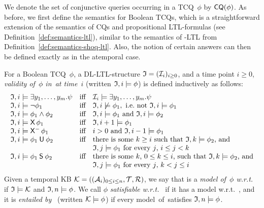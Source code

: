 \noindent
We denote the set of conjunctive queries occurring in a TCQ~$\phi$ by
$\operatorname{\mathsf{CQ}}(\phi)$.  As before, we first define the semantics for Boolean TCQs, which
is a straightforward extension of the semantics of CQs and propositional
LTL-formulas (see Definition~\ref{def:semantics-ltl}), similar to the semantics
of \SHOQ-LTL from Definition~\ref{def:semantics-shoq-ltl}.
%
Also, the notion of certain answers can then be defined exactly as in the
atemporal case.

\begin{definition}\label{def:semantics-tcqs}
    For a Boolean TCQ~$\phi$, a DL-LTL-structure $\mathfrak{I}=(\mathcal{I}_i)_{i\ge 0}$, and
    a time point $i\ge 0$, \emph{validity of~$\phi$ in~\Imf at time~$i$}
    (written $\mathfrak{I},i\models\phi$) is defined inductively as follows:
    \[\begin{array}{lcl}
        \Imf,i\models\exists y_1,\dots,y_m.\psi
            &\text{iff}
            &\Imc_i\models\exists y_1,\dots,y_m.\psi\\
        \Imf,i\models\lnot\phi_1
            &\text{iff}
            &\Imf,i\not\models\phi_1,\ \text{i.e.~not}\ \Imf,i\models\phi_1\\
        \Imf,i\models\phi_1\land\phi_2
            &\text{iff}
            &\Imf,i\models\phi_1\ \text{and}\ \Imf,i\models\phi_2\\
        \Imf,i\models\Next\phi_1
            &\text{iff}
            &\Imf,i+1\models\phi_1\\
        \Imf,i\models\Previous\phi_1
            &\text{iff}
            &i>0\ \text{and}\ \Imf,i-1\models\phi_1\\
        \Imf,i\models\phi_1\Until\phi_2
            &\text{iff}
            &\text{there is some $k\geq i$ such that $\Imf,k\models\phi_2$, and}\\
            & &\text{$\Imf,j\models\phi_1$ for every $j$, $i\le j<k$}\\
        \Imf,i\models\phi_1\Since\phi_2
            &\text{iff}
            &\text{there is some $k$, $0\le k\le i$, such that $\Imf,k\models\phi_2$, and}\\
            & &\text{$\Imf,j\models\phi_1$ for every $j$, $k<j\le i$}
    \end{array}\]
    Given a temporal KB $\mathcal{K}=((\mathcal{A}_i)_{0\le i\le n},\mathcal{T},\mathcal{R})$,
    we say that \Imf is a \emph{model of~$\phi$ w.r.t.~\Kmc} if
    $\mathfrak{I}\models\mathcal{K}$ and $\mathfrak{I},n\models\phi$.  We call $\phi$ \emph{satisfiable
    w.r.t.~\Kmc} if it has a model w.r.t.~\Kmc, and it is \emph{entailed
    by~\Kmc} (written $\mathcal{K}\models\phi$) if every model~\Imf of~\Kmc satisfies
    $\mathfrak{I},n\models\phi$.


\end{definition}
